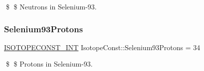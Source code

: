 \$ \$ Neutrons in Selenium-\/93. \mbox{\label{group___isotope_const-_selenium-_se93_gabff3ce4a4f03539a9fa34a4c70663f41}} 
\subsubsection{\texorpdfstring{Selenium93\+Protons}{Selenium93Protons}}
{\footnotesize\ttfamily \mbox{\hyperlink{group___isotope_const-_macros_ga5f18360b3e99483a35c32d789e62621c}{I\+S\+O\+T\+O\+P\+E\+C\+O\+N\+S\+T\+\_\+\+I\+NT}} Isotope\+Const\+::\+Selenium93\+Protons = 34}

\$ \$ Protons in Selenium-\/93. 